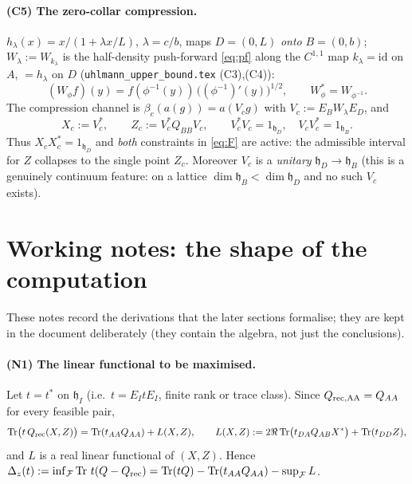 \documentclass[11pt]{article}
\begin{document}
\paragraph{(C5) The zero-collar compression.}
$h_\lambda(x)=x/(1+\lambda x/L)$, $\lambda=c/b$, maps $D=(0,L)$ \emph{onto} $B=(0,b)$;
$W_\lambda:=W_{k_\lambda}$ is the half-density push-forward \eqref{eq:pf} along the
$C^{1,1}$ map $k_\lambda=\mathrm{id}$ on $A$, $=h_\lambda$ on $D$
(\texttt{uhlmann\_upper\_bound.tex} (C3),(C4)):
\begin{equation}\label{eq:pf}
 (W_\phi f)(y)=f(\phi^{-1}(y))\,\bigl((\phi^{-1})'(y)\bigr)^{1/2},\qquad W_\phi^*=W_{\phi^{-1}} .
\end{equation}
The compression channel is $\beta_c(a(g))=a(V_cg)$ with $V_c:=E_BW_\lambda E_D$, and
\begin{equation}\label{eq:comp}
 X_c:=V_c^*,\qquad Z_c:=V_c^*Q_{BB}V_c,\qquad V_c^*V_c=1_{\mathfrak h_D},\quad V_cV_c^*=1_{\mathfrak h_B}.
\end{equation}
Thus $X_cX_c^*=1_{\mathfrak h_D}$ and \emph{both} constraints in \eqref{eq:F} are active:
the admissible interval for $Z$ collapses to the single point $Z_c$.  Moreover $V_c$ is a
\emph{unitary} $\mathfrak h_D\to\mathfrak h_B$ (this is a genuinely continuum feature: on a
lattice $\dim\mathfrak h_B<\dim\mathfrak h_D$ and no such $V_c$ exists).

\section{Working notes: the shape of the computation}\label{sec:notes}

These notes record the derivations that the later sections formalise; they are kept in
the document deliberately (they contain the algebra, not just the conclusions).

\paragraph{(N1) The linear functional to be maximised.}
Let $t=t^*$ on $\mathfrak h_I$ (i.e.\ $t=E_ItE_I$, finite rank or trace class).  Since
$Q_{\rm rec,AA}=Q_{AA}$ for every feasible pair,
\begin{equation}\label{eq:Lfun}
 \operatorname{Tr}\bigl(t\,Q_{\rm rec}(X,Z)\bigr)=\operatorname{Tr}(t_{AA}Q_{AA})+L(X,Z),\qquad
 L(X,Z):=2\Re\operatorname{Tr}\bigl(t_{DA}Q_{AB}X^*\bigr)+\operatorname{Tr}(t_{DD}Z),
\end{equation}
and $L$ is a real linear functional of $(X,Z)$.  Hence
$\Delta_z(t):=\inf_{\mathcal F}\operatorname{Tr}\,t(Q-Q_{\rm rec})=\operatorname{Tr}(tQ)-\operatorname{Tr}(t_{AA}Q_{AA})-\sup_\mathcal F L$.
\end{document}
